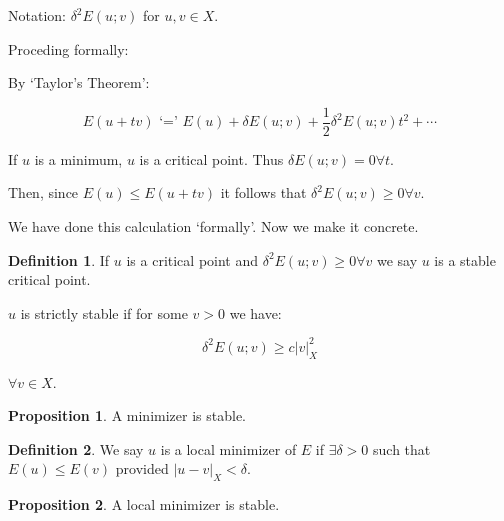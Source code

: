\documentclass{article}
\theoremstyle{definition}
\newtheorem{definition}{Definition}
\newtheorem{proposition}{Proposition}
\begin{document}
Notation: \(\delta^2 E(u;v)\) for \(u,v\in X\).

Proceding formally:

By `Taylor's Theorem':

\[
    E(u+tv) \text{ `=' } E(u) + \delta E(u;v) + \frac{1}{2} \delta^2 E(u;v)t^2 + \cdots 
\]

If \(u\) is a minimum, \(u\) is a critical point. Thus \(\delta E(u;v) = 0 \forall t\).

Then, since \(E(u) \leq E(u+tv)\) it follows that \(\delta^2 E(u;v) \geq 0 \forall v\).

We have done this calculation `formally'. Now we make it concrete.

\begin{definition}
    If \(u\) is a critical point and \(\delta^2 E(u;v) \geq 0 \forall v\) we say \(u\) is a stable critical point.

    \(u\) is strictly stable if for some \(v > 0\) we have:

    \[
        \delta^2 E(u;v) \geq c \vert v \vert_X^2
    \]

    \(\forall v\in X\).
\end{definition}

\begin{proposition}
    A minimizer is stable.
\end{proposition}

\begin{definition}
    We say \(u\) is a local minimizer of \(E\) if \(\exists \delta > 0\) such that \(E(u) \leq E(v)\) provided \(\vert u-v \vert_X < \delta\).
\end{definition}

\begin{proposition}
    A local minimizer is stable.
\end{proposition}
\end{document}
